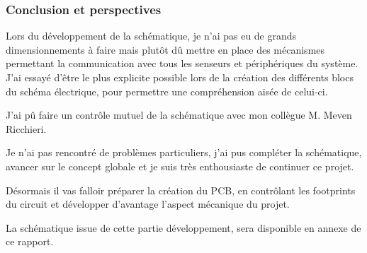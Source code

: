 {	\clearpage
	\subsubsection{Conclusion et perspectives} \label{sssec:MethSchematic}
	{
		Lors du développement de la schématique, je n'ai pas eu de grands dimensionnements à faire mais plutôt dû mettre en place des mécanismes permettant la communication avec tous les senseurs et périphériques du système. J'ai essayé d'être le plus explicite possible lors de la création des différents blocs du schéma électrique, pour permettre une compréhension aisée de celui-ci. 
		
		J'ai pû faire un contrôle mutuel de la schématique avec mon collègue M. Meven Ricchieri.
		
		Je n'ai pas rencontré de problèmes particuliers, j'ai pus compléter la schématique, avancer sur le concept globale et je suis très enthousiaste de continuer ce projet.
		
		Désormais il vas falloir préparer la création du PCB, en contrôlant les footprints du circuit et développer d'avantage l'aspect mécanique du projet.
		
		La schématique issue de cette partie développement,  sera disponible en annexe de ce rapport.
		
		
	}
	

}


\clearpage